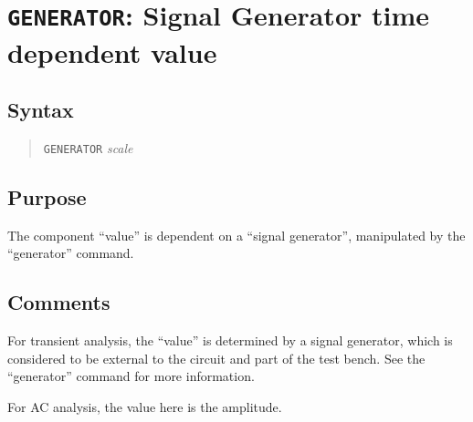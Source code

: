 %
%
%
%
\section{{\tt GENERATOR}: Signal Generator time dependent value}
\subsection{Syntax}
\begin{verse}
{\tt GENERATOR} {\it scale}
\end{verse}
\subsection{Purpose}

The component ``value'' is dependent on a ``signal generator'',
manipulated by the ``generator'' command.
\subsection{Comments}

For transient analysis, the ``value'' is determined by a signal
generator, which is considered to be external to the circuit and part
of the test bench.  See the ``generator'' command for more
information.

For AC analysis, the value here is the amplitude.

